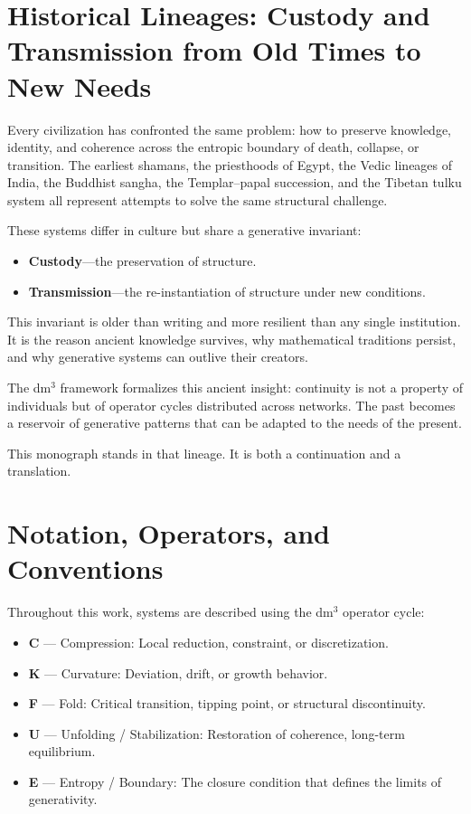 \documentclass[14pt, twoside, openright]{book}
\theoremstyle{definition}
\theoremstyle{remark}
\begin{document}
\chapter{Historical Lineages: Custody and Transmission from Old Times to New Needs}

Every civilization has confronted the same problem: how to preserve knowledge,
identity, and coherence across the entropic boundary of death, collapse, or
transition. The earliest shamans, the priesthoods of Egypt, the Vedic lineages
of India, the Buddhist sangha, the Templar--papal succession, and the Tibetan
tulku system all represent attempts to solve the same structural challenge.

These systems differ in culture but share a generative invariant:

\begin{itemize}[leftmargin=2em]
  \item \textbf{Custody}---the preservation of structure.
  \item \textbf{Transmission}---the re-instantiation of structure under new conditions.
\end{itemize}

This invariant is older than writing and more resilient than any single
institution. It is the reason ancient knowledge survives, why mathematical
traditions persist, and why generative systems can outlive their creators.

The dm$^{3}$ framework formalizes this ancient insight: continuity is not a
property of individuals but of operator cycles distributed across networks.
The past becomes a reservoir of generative patterns that can be adapted to the
needs of the present.

This monograph stands in that lineage. It is both a continuation and a
translation.

\chapter{Notation, Operators, and Conventions}

Throughout this work, systems are described using the dm$^{3}$ operator cycle:

\begin{itemize}[leftmargin=2em]
  \item \textbf{C} --- Compression: Local reduction, constraint, or discretization.
  \item \textbf{K} --- Curvature: Deviation, drift, or growth behavior.
  \item \textbf{F} --- Fold: Critical transition, tipping point, or structural discontinuity.
  \item \textbf{U} --- Unfolding / Stabilization: Restoration of coherence, long-term equilibrium.
  \item \textbf{E} --- Entropy / Boundary: The closure condition that defines the limits
        of generativity.
\end{itemize}
\end{document}
